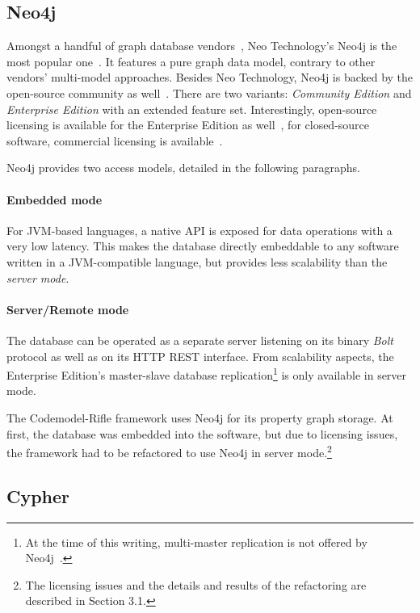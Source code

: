 \subsection{Neo4j}

Amongst a handful of graph database vendors~\cite{graph-dbs}, Neo Technology's Neo4j is the most popular one~\cite{graph-dbs-raking}. It features a pure graph data model, contrary to other vendors' multi-model approaches. Besides Neo Technology, Neo4j is backed by the open-source community as well~\cite{neo4j-github}. There are two variants: \emph{Community Edition} and \emph{Enterprise Edition} with an extended feature set. Interestingly, open-source licensing is available for the Enterprise Edition as well~\cite{neo4j-opensource}, for closed-source software, commercial licensing is available~\cite{neo4j-licensing}.

Neo4j provides two access models, detailed in the following paragraphs.

\paragraph{Embedded mode} For JVM-based languages, a native API is exposed for data operations with a very low latency. This makes the database directly embeddable to any software written in a JVM-compatible language, but provides less scalability than the \emph{server mode}.

\paragraph{Server/Remote mode} The database can be operated as a separate server listening on its binary \emph{Bolt} protocol as well as on its HTTP REST interface. From scalability aspects, the Enterprise Edition's master-slave database replication\footnote{At the time of this writing, multi-master replication is not offered by Neo4j~\cite{neo4j-clustering-architecture}.} is only available in server mode.

The Codemodel-Rifle framework uses Neo4j for its property graph storage. At first, the database was embedded into the software, but due to licensing issues, the framework had to be refactored to use Neo4j in server mode.\footnote{The licensing issues and the details and results of the refactoring are described in Section 3.1.}

\subsection{Cypher}

